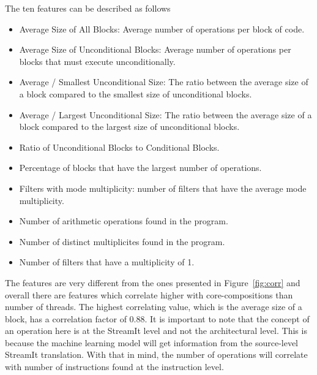 The ten features can be described as follows
\begin{itemize}
\item Average Size of All Blocks: Average number of operations per block of code.
\vspace{-1em}
\item Average Size of Unconditional Blocks: Average number of operations per blocks that must execute unconditionally.
\vspace{-1em}
\item Average / Smallest Unconditional Size: The ratio between the average size of a block compared to the smallest size of unconditional blocks.
\vspace{-1em}
\item Average / Largest Unconditional Size: The ratio between the average size of a block compared to the largest size of unconditional blocks.
\vspace{-1em}
\item Ratio of Unconditional Blocks to Conditional Blocks.
\vspace{-1em}
\item Percentage of blocks that have the largest number of operations.
\vspace{-1em}
\item Filters with mode multiplicity: number of filters that have the average mode multiplicity.
\vspace{-1em}
\item Number of arithmetic operations found in the program.
\vspace{-1em}
\item Number of distinct multiplicites found in the program.
\vspace{-1em}
\item Number of filters that have a multiplicity of 1.
\end{itemize}


The features are very different from the ones presented in Figure~\ref{fig:corr} and overall there are features which correlate higher with core-compositions than number of threads.
The highest correlating value, which is the average size of a block, has a correlation factor of 0.88.
It is important to note that the concept of an operation here is at the StreamIt level and not the architectural level.
This is because the machine learning model will get information from the source-level StreamIt translation.
With that in mind, the number of operations will correlate with number of instructions found at the instruction level.

